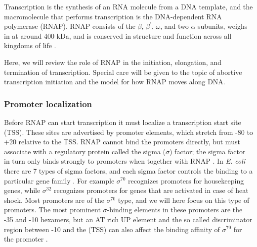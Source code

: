 %
Transcription is the synthesis of an RNA molecule from a DNA template, and the
macromolecule that performs transcription is the DNA-dependent RNA polymerase
(RNAP). RNAP consists of the $\beta$, $\beta^{\prime}$, $\omega$, and two
$\alpha$ subunits, weighs in at around 400 kDa, and is conserved in structure
and function across all kingdoms of life \cite{borukhov_rna_2008}.

Here, we will review the role of RNAP in the initiation, elongation, and
termination of transcription. Special care will be given to the topic of
abortive transcription initiation and the model for how RNAP moves along DNA.

\subsubsection{Promoter localization}
Before RNAP can start transcription it must localize a transcription start site
(TSS). These sites are advertised by promoter elements, which stretch from -80
to +20 relative to the TSS. RNAP cannot bind the promoters directly, but must
associate with a regulatory protein called the sigma ($\sigma$) factor; the
sigma factor in turn only binds strongly to promoters when together with RNAP
\cite{paget_70_2003}. In \textit{E. coli} there are 7 types of sigma factors,
and each sigma factor controls the binding to a particular gene family
\cite{osterberg_regulation_2011}. For example $\sigma^{70}$ recognizes
promoters for housekeeping genes, while $\sigma^{32}$ recognizes promoters for
genes that are activated in case of heat shock. Most promoters are of the
$\sigma^{70}$ type, and we will here focus on this type of promoters. The most
prominent $\sigma$-binding elements in these promoters are the -35 and -10
hexamers, but an AT rich UP element and the so called discriminator region
between -10 and the (TSS) can also affect the binding affinity of $\sigma^{70}$
for the promoter \cite{ross_third_1993, haugen_fine_2008}.

